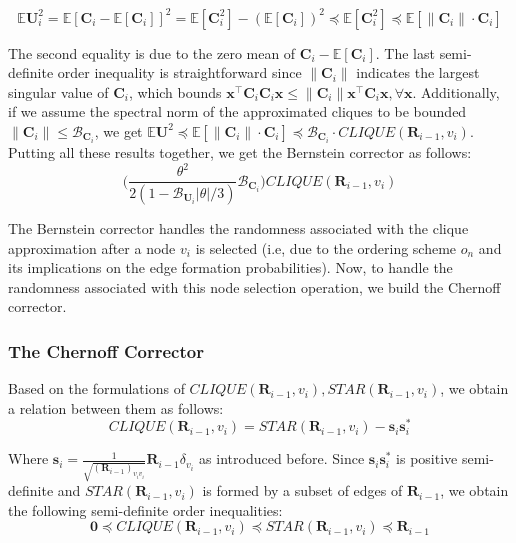 \documentclass{article}
\newcommand{\norm}[1]{\left\lVert#1\right\rVert}
\def\mC{{\mathbf{C}}}
\def\mR{{\mathbf{R}}}
\def\mU{{\mathbf{U}}}
\def\vzero{{\mathbf{0}}}
\def\vs{{\mathbf{s}}}
\def\vx{{\mathbf{x}}}
\theoremstyle{plain}
\theoremstyle{definition}
\theoremstyle{remark}
\begin{document}
\begin{equation}
\label{eq:clique_var}
\mathbb{E}\mU_i^2 = \mathbb{E}[\mC_i - \mathbb{E}[\mC_i]]^2  = \mathbb{E}[\mC_i^2] - (\mathbb{E}[\mC_i])^2 \preccurlyeq \mathbb{E}[\mC_i^2] \preccurlyeq \mathbb{E}[\norm{\mC_i}\cdot \mC_i]
\end{equation}

The second equality is due to the zero mean of $\mC_i - \mathbb{E}[\mC_i]$. The last semi-definite order inequality is straightforward since $\norm{\mC_i}$ indicates the largest singular value of $\mC_i$, which bounds $\vx^\top \mC_i\mC_i \vx \le \norm{\mC_i} \vx^\top \mC_i \vx, \forall \vx$. Additionally, if we assume the spectral norm of the approximated cliques to be bounded $\norm{\mC_i} \le \mathcal{B}_{\mC_i}$, we get $\mathbb{E}\mU^2 \preccurlyeq \mathbb{E}[\norm{\mC_i}\cdot \mC_i]  \preccurlyeq  \mathcal{B}_{\mC_i} \cdot \textit{CLIQUE}(\mR_{i-1}, v_i)$. Putting all these results together, we get the Bernstein corrector as follows:
\begin{equation}
\label{eq:bernstein_corrector}
    \bigg ( \frac{\theta^2}{2 (1 - \mathcal{B}_{\mU_i}|\theta|/3)}\mathcal{B}_{\mC_i}  \bigg ) \textit{CLIQUE}(\mR_{i-1}, v_i)
\end{equation}

The Bernstein corrector handles the randomness associated with the clique approximation after a node $v_i$ is selected (i.e, due to the ordering scheme $o_n$ and its implications on the edge formation probabilities). Now, to handle the randomness associated with this node selection operation, we build the Chernoff corrector.
\subsubsection{The Chernoff Corrector}

Based on the formulations of $\textit{CLIQUE}(\mR_{i-1}, v_i), \textit{STAR}(\mR_{i-1}, v_i)$, we obtain a relation between them as follows:
\begin{equation}
    \textit{CLIQUE}(\mR_{i-1}, v_i) = \textit{STAR}(\mR_{i-1}, v_i) - \vs_i\vs_i^*
\end{equation}

Where $\vs_i = \frac{1}{\sqrt{(\mR_{i-1})_{v_iv_i}}}\mR_{i-1}\delta_{v_i}$ as introduced before. Since $\vs_i\vs_i^*$ is positive semi-definite and $\textit{STAR}(\mR_{i-1}, v_i)$ is formed by a subset of edges of $\mR_{i-1}$, we obtain the following semi-definite order inequalities:
\begin{equation}
\label{eq:clique_star_sc_ineq}
    \vzero \preccurlyeq \textit{CLIQUE}(\mR_{i-1}, v_i) \preccurlyeq \textit{STAR}(\mR_{i-1}, v_i) \preccurlyeq \mR_{i-1}
\end{equation}
\end{document}
